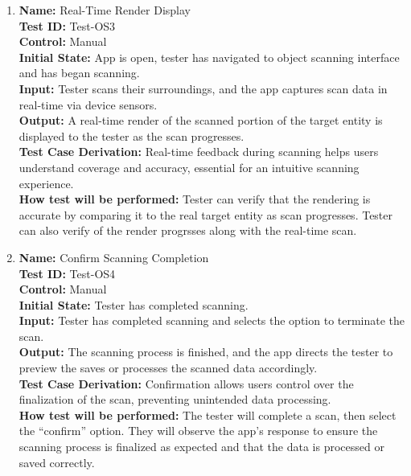 \documentclass[12pt, titlepage]{article}
\begin{document}
\begin{enumerate}
  \item \textbf{Name:} Real-Time Render Display \label{itm:Test-OS3} \\
  \textbf{Test ID:} Test-OS3 \\
  \textbf{Control:} Manual \\
  \textbf{Initial State:} App is open, tester has navigated to object scanning interface and has began scanning. \\
  \textbf{Input:} Tester scans their surroundings, and the app captures scan data in real-time via device sensors. \\
  \textbf{Output:} A real-time render of the scanned portion of the target entity is displayed to the tester as the scan progresses. \\
  \textbf{Test Case Derivation:} Real-time feedback during scanning helps users understand coverage and accuracy, essential for an intuitive scanning experience. \\
  \textbf{How test will be performed:} Tester can verify that the rendering is accurate by comparing it to the real target entity as scan progresses. Tester can also verify of the render progrsses along with the real-time scan. \\

  \item \textbf{Name:} Confirm Scanning Completion \label{itm:Test-OS4} \\
  \textbf{Test ID:} Test-OS4 \\
  \textbf{Control:} Manual \\
  \textbf{Initial State:} Tester has completed scanning. \\
  \textbf{Input:} Tester has completed scanning and selects the option to terminate the scan. \\
  \textbf{Output:} The scanning process is finished, and the app directs the tester to preview the saves or processes the scanned data accordingly. \\
  \textbf{Test Case Derivation:} Confirmation allows users control over the finalization of the scan, preventing unintended data processing. \\
  \textbf{How test will be performed:} The tester will complete a scan, then select the “confirm” option. They will observe the app's response to ensure the scanning process is finalized as expected and that the data is processed or saved correctly. \\

\end{enumerate}
\end{document}
